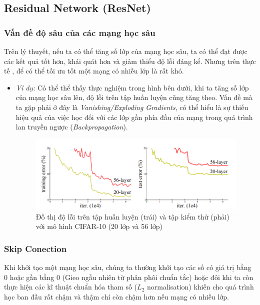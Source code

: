 \documentclass[a4paper, 12pt]{article}
\begin{document}
\subsection{Residual Network (ResNet)}
\subsubsection{Vấn đề độ sâu của các mạng học sâu}
Trên lý thuyết, nếu ta có thể tăng số lớp của mạng học sâu, ta có thể  đạt được các kết quả tốt hơn, khái quát hơn và giảm thiểu độ lỗi đáng kể. Nhưng trên thực tế , để có thể tối ưu tốt một mạng có nhiều lớp là rất khó.

    \begin{itemize}
        \item \textit{Ví dụ:} Có thể thể thấy thực nghiệm trong hình bên dưới, khi ta tăng số lớp của mạng học sâu lên, độ lỗi trên tập huấn luyện cũng tăng theo. Vấn đề mà ta gặp phải ở đây là \textit{Vanishing/Exploding Gradients}, có thể hiểu là sự thiếu hiệu quả của việc học đối với các lớp gần phía đầu của mạng trong quá trình lan truyền ngược (\textit{Backpropagation}).
            \begin{figure}[H]
                \begin{center}
                    \includegraphics[scale=0.5]{img/resnet-problem}
                    \caption{Đồ thị độ lỗi trên tập huấn luyện (trái) và tập kiểm thử (phải) với mô hình CIFAR-10 (20 lớp và 56 lớp)}
                \end{center}
            \end{figure}
    \end{itemize}

\subsubsection{Skip Conection}
Khi khởi tạo một mạng học sâu, chúng ta thường khởi tạo các số có giá trị bằng 0 hoặc gần bằng 0 (Gieo ngẫu nhiên từ phân phôi chuẩn tắc) hoặc đôi khi ta còn thực hiện các kĩ thuật chuẩn hóa tham số ($L_2$ normalisation) khiến cho quá trình học ban đầu rất chậm và thậm chí còn chậm hơn nếu mạng có nhiều lớp.
\end{document}
